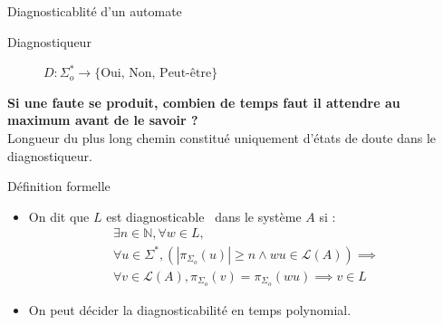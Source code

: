 \documentclass[11pt]{beamer}
\begin{document}
\begin{section}{Diagnosticablit\'e d'un automate}
\begin{frame}{Diagnostiqueur}
\begin{figure}
\centering
  \caption{$D : \Sigma_o^* \to \{\mbox{Oui,\ Non,\ Peut-\^etre}\}$ ~\cite{SamSRST96}}
\end{figure}
\pause
\textbf{Si une faute se produit, combien de temps faut il attendre au maximum avant de le savoir ?}\\
\pause
Longueur du plus long chemin constitué uniquement d'états de doute dans le diagnostiqueur. \\

\end{frame}

\begin{frame}{Définition formelle}
\centering
\begin{itemize}
\item On dit que $L$ est diagnosticable~\cite{SamSRST96} dans le système $A$ si :
$$\begin{array}{l}
\exists n \in \mathbb N, \forall w \in L,\\
\forall u \in \Sigma^*, \left(\left|\pi_{\Sigma_o}(u)\right|\ge n \land wu \in \mathcal L(A)\right) \implies\\
\forall v \in \mathcal L(A), \pi_{\Sigma_o}(v)=\pi_{\Sigma_o}(wu) \implies v \in L
\end{array}$$ 
\vspace{1cm}
\pause
\item On peut décider la diagnosticabilité en temps polynomial.
\end{itemize}
\end{frame}
\end{section}
\end{document}

